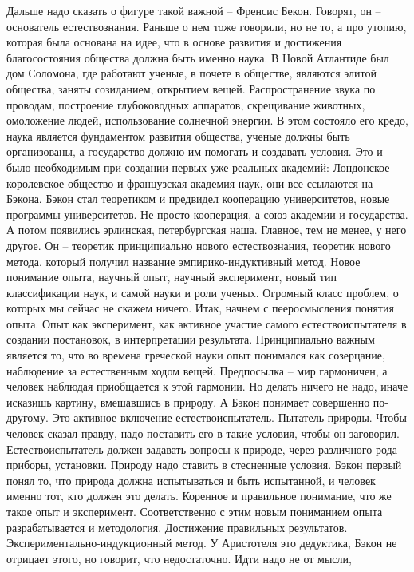 \documentclass[a4paper, 12pt]{article}
\begin{document}
Дальше надо сказать о фигуре такой важной -- Френсис Бекон. Говорят, он 
-- основатель естествознания. Раньше о нем тоже говорили, но не то, 
а про утопию, которая была основана на идее, что в основе развития 
и достижения благосостояния общества должна быть именно наука. В Новой 
Атлантиде был дом Соломона, где работают ученые, в почете в обществе, 
являются элитой общества, заняты созиданием, открытием вещей. 
Распространение звука по проводам, построение глубоководных аппаратов, 
скрещивание животных, омоложение людей, использование солнечной энергии. 
В этом состояло его кредо, наука является фундаментом развития общества, 
ученые должны быть организованы, а государство должно им помогать 
и создавать условия. Это и было необходимым при создании первых уже 
реальных академий: Лондонское королевское общество и французская 
академия наук, они все ссылаются на Бэкона. Бэкон стал теоретиком 
и предвидел кооперацию университетов, новые программы университетов. Не 
просто кооперация, а союз академии и государства. А потом появились 
эрлинская, петербургская наша. Главное, тем не менее, у него другое. Он 
-- теоретик принципиально нового естествознания, теоретик нового метода, 
который получил название эмпирико-индуктивный метод. Новое понимание 
опыта, научный опыт, научный эксперимент, новый тип классификации наук, 
и самой науки и роли ученых. Огромный класс проблем, о которых мы сейчас 
не скажем ничего. Итак, начнем с пееросмысления понятия опыта. Опыт как 
эксперимент, как активное участие самого естествоиспытателя в создании 
постановок, в интерпретации результата. Принципиально важным является 
то, что во времена греческой науки опыт понимался как созерцание, 
наблюдение за естественным ходом вещей. Предпосылка -- мир гармоничен, 
а человек наблюдая приобщается к этой гармонии. Но делать ничего не 
надо, иначе исказишь картину, вмешавшись в природу. А Бэкон понимает 
совершенно по-другому. Это активное включение естествоиспытатель. 
Пытатель природы. Чтобы человек сказал правду, надо поставить его 
в такие условия, чтобы он заговорил. Естествоиспытатель должен задавать 
вопросы к природе, через различного рода приборы, установки. Природу 
надо ставить в стесненные условия. Бэкон первый понял то, что природа 
должна испытываться и быть испытанной, и человек именно тот, кто должен 
это делать. Коренное и правильное понимание, что же такое опыт 
и эксперимент. Соответственно с этим новым пониманием опыта 
разрабатывается и методология. Достижение правильных результатов. 
Экспериментально-индукционный метод. У Аристотеля это дедуктика, Бэкон 
не отрицает этого, но говорит, что недостаточно. Идти надо не от мысли, 
\end{document}
